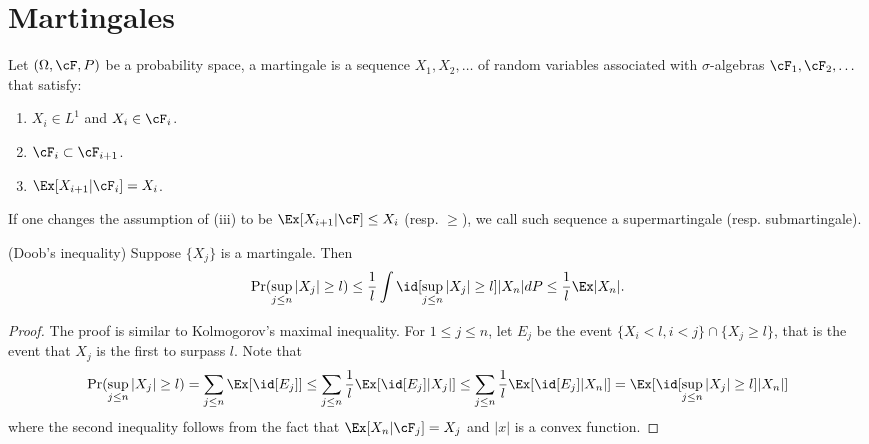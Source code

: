 \section{Martingales}

\begin{definition}
	Let $(\Omega, \cF, P)$ be a probability space, a martingale is a
	sequence $X_1, X_2, \dots$
	of random variables associated with $\sigma$-algebras $\cF_1, \cF_2, \dots$
	that satisfy:
	\begin{enumerate}[label=(\roman*)]
		\item $X_i \in L^1$ and $X_i \in \cF_i$.
		\item $\cF_i \subset \cF_{i+1}$.
		\item $\Ex[X_{i+1} | \cF_i] = X_i$.
	\end{enumerate}
\end{definition}

\begin{remark}
	If one changes the assumption of (iii) to be $\Ex[X_{i+1}|\cF] \leq
	X_i$ (resp. $\geq$), we call such sequence a supermartingale
	(resp. submartingale).
\end{remark}

\begin{theorem}(Doob's inequality)
	\label{trm:doob_ineq}
	Suppose $\{X_j\}$ is a martingale. Then
	\[
		\Pr(\sup_{j \leq n} |X_j| \geq l) \leq \frac{1}{l}
		\int\id[\sup_{j \leq n} |X_j| \geq l]|X_n|dP \leq \frac{1}{l}\Ex|X_n|.
	\]
\end{theorem}

\begin{proof}
	The proof is similar to Kolmogorov's maximal inequality. For $1
	\leq j \leq n$, let $E_j$ be the event
	$\{X_i < l, i < j\} \cap \{X_j \geq l\}$, that is the event that
	$X_j$ is the first to surpass $l$.
	Note that
	\begin{align}
		\Pr(\sup_{j \leq n} |X_j| \geq l) = \sum_{j \leq n} \Ex[\id[E_j]]
		\leq \sum_{j \leq n} \frac{1}{l}\Ex[\id[E_j]|X_j|] \leq \sum_{j
		\leq n} \frac{1}{l}\Ex[\id[E_j]|X_n|] = \Ex[\id[\sup_{j \leq n}
		|X_j| \geq l]|X_n|]
	\end{align}
	where the second inequality follows from the fact that $\Ex[X_n |
	\cF_j] = X_j$ and $|x|$ is a convex function.
\end{proof}

